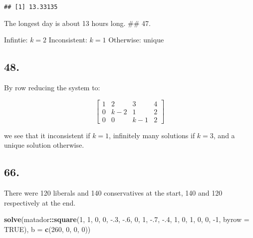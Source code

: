 \documentclass[]{article}
\newenvironment{Shaded}{\begin{snugshade}}{\end{snugshade}}
\newcommand{\DataTypeTok}[1]{\textcolor[rgb]{0.13,0.29,0.53}{#1}}
\newcommand{\DecValTok}[1]{\textcolor[rgb]{0.00,0.00,0.81}{#1}}
\newcommand{\FloatTok}[1]{\textcolor[rgb]{0.00,0.00,0.81}{#1}}
\newcommand{\KeywordTok}[1]{\textcolor[rgb]{0.13,0.29,0.53}{\textbf{#1}}}
\newcommand{\NormalTok}[1]{#1}
\newcommand{\OperatorTok}[1]{\textcolor[rgb]{0.81,0.36,0.00}{\textbf{#1}}}
\newcommand{\OtherTok}[1]{\textcolor[rgb]{0.56,0.35,0.01}{#1}}
\begin{document}
\begin{Shaded}
\end{Shaded}

\begin{verbatim}
## [1] 13.33135
\end{verbatim}

The longest day is about 13 hours long. \#\# 47.

Infintie: \(k=2\) Inconsistent: \(k= 1\) Otherwise: unique

\hypertarget{section-12}{%
\subsection{48.}\label{section-12}}

By row reducing the system to:

\[\begin{bmatrix}1&2&3&4\\
0&k-2&1&2\\
0&0&k-1&2\end{bmatrix}\]

we see that it inconsistent if \(k=1\), infinitely many solutions if
\(k=3\), and a unique solution otherwise.

\hypertarget{section-13}{%
\subsection{66.}\label{section-13}}

There were 120 liberals and 140 conservatives at the start, 140 and 120
respectively at the end.

\begin{Shaded}
\begin{Highlighting}[]
\KeywordTok{solve}\NormalTok{(matador}\OperatorTok{::}\KeywordTok{square}\NormalTok{(}\DecValTok{1}\NormalTok{, }\DecValTok{1}\NormalTok{, }\DecValTok{0}\NormalTok{, }\DecValTok{0}\NormalTok{, }\FloatTok{-.3}\NormalTok{, }\FloatTok{-.6}\NormalTok{, }\DecValTok{0}\NormalTok{, }\DecValTok{1}\NormalTok{, }\FloatTok{-.7}\NormalTok{, }\FloatTok{-.4}\NormalTok{, }\DecValTok{1}\NormalTok{, }\DecValTok{0}\NormalTok{, }\DecValTok{1}\NormalTok{, }\DecValTok{0}\NormalTok{, }\DecValTok{0}\NormalTok{, }\DecValTok{-1}\NormalTok{, }\DataTypeTok{byrow =} \OtherTok{TRUE}\NormalTok{), }\DataTypeTok{b =} \KeywordTok{c}\NormalTok{(}\DecValTok{260}\NormalTok{, }\DecValTok{0}\NormalTok{, }\DecValTok{0}\NormalTok{, }\DecValTok{0}\NormalTok{))}
\end{Highlighting}
\end{Shaded}
\end{document}
